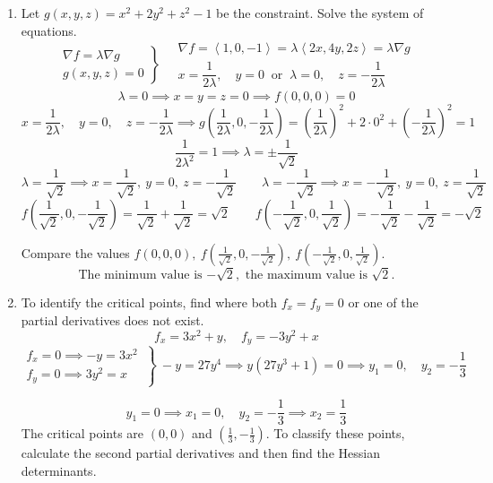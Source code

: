\documentclass[a4paper, 12pt]{article}
\begin{document}
\begin{enumerate}[leftmargin=*,label=\textbf{\arabic*.}]
\item Let $g(x,y,z)=x^2+2y^2+z^2-1$ be the constraint. Solve the system of equations.
\[
\left.
\begin{array}{c}
\displaystyle\nabla f=\lambda\nabla g\\
\displaystyle g(x,y,z)=0
\end{array}
\right\}\quad
\begin{array}{l}
\nabla f=\left\langle1,0,-1\right\rangle=\lambda\left\langle2x,4y,2z\right\rangle=\lambda\nabla g\\x=\dfrac1{2\lambda},\quad y=0\:\text{ or }\:\lambda=0,\quad z=-\dfrac1{2\lambda}
\end{array}
\]
\[\lambda=0\implies x=y=z=0\implies f(0,0,0)=0\]
\[x=\frac1{2\lambda},\quad y=0,\quad z=-\frac1{2\lambda}\implies g\left(\frac1{2\lambda},0,-\frac1{2\lambda}\right)=\left(\frac1{2\lambda}\right)^2+2\cdot0^2+\left(-\frac1{2\lambda}\right)^2=1\]
\[\frac1{2\lambda^2}=1\implies\lambda=\pm\frac1{\sqrt2}\]
\[\lambda=\frac1{\sqrt2}\implies x=\frac1{\sqrt2},\: y=0,\: z=-\frac1{\sqrt2}\qquad\lambda=-\frac1{\sqrt2}\implies x=-\frac1{\sqrt2},\: y=0,\: z=\frac1{\sqrt2}\]
\[f\left(\frac1{\sqrt2},0,-\frac1{\sqrt2}\right)=\frac1{\sqrt2}+\frac1{\sqrt2}=\sqrt2\qquad f\left(-\frac1{\sqrt2},0,\frac1{\sqrt2}\right)=-\frac1{\sqrt2}-\frac1{\sqrt2}=-\sqrt2\]

Compare the values $f(0,0,0),\:f\left(\frac1{\sqrt2},0,-\frac1{\sqrt2}\right),\:f\left(-\frac1{\sqrt2},0,\frac1{\sqrt2}\right)$.
\[\boxed{\text{The minimum value is }{-\sqrt2},\text{ the maximum value is }\sqrt2.}\]

\item To identify the critical points, find where both $f_x=f_y=0$ or one of the partial derivatives does not exist.
\[f_x=3x^2+y,\quad f_y=-3y^2+x\]
\[\left.\begin{array}{c}
f_x=0\implies-y=3x^2\\
f_y=0\implies3y^2=x 
\end{array}\:\right\}\:-y=27y^4\implies y(27y^3+1)=0\implies y_1=0,\quad y_2=-\frac13\]

\[y_1=0\implies x_1=0,\quad y_2=-\frac13\implies x_2=\frac13\]
The critical points are $(0,0)$ and $\left(\frac13,-\frac13\right)$. To classify these points, calculate the second partial derivatives and then find the Hessian determinants.


\end{enumerate}
\end{document}
